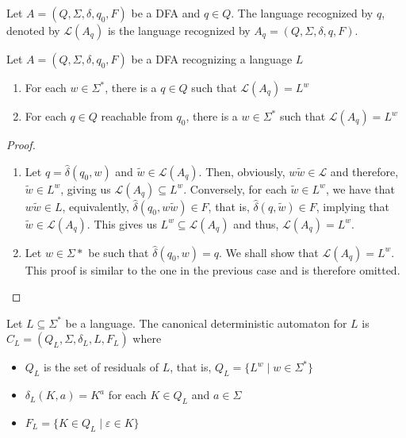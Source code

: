 \begin{definition}
    Let $A = (Q,\Sigma,\delta,q_0,F)$ be a DFA and $q\in Q$. The language recognized by $q$, denoted by $\mathcal{L}(A_q)$ is the language recognized by $A_q=(Q,\Sigma,\delta,q,F)$.
\end{definition}

\begin{proposition}
    Let $A = (Q,\Sigma,\delta,q_0,F)$ be a DFA recognizing a language $L$ 
    \begin{enumerate}
        \item For each $w\in\Sigma^*$, there is a $q\in Q$ such that $\mathcal{L}(A_q) = L^w$ 
        \item For each $q\in Q$ reachable from $q_0$, there is a $w\in\Sigma^*$ such that $\mathcal{L}(A_q)=L^w$
    \end{enumerate}
\end{proposition}
\begin{proof}
    \hfill 
    \begin{enumerate}
        \item Let $q = \hat{\delta}(q_0, w)$ and $\widetilde{w}\in\mathcal{L}(A_q)$. Then, obviously, $w\widetilde{w}\in\mathcal{L}$ and therefore, $\widetilde{w}\in L^w$, giving us $\mathcal{L}(A_q)\subseteq L^w$. Conversely, for each $\widetilde{w}\in L^w$, we have that $w\widetilde{w}\in L$, equivalently, $\hat{\delta}(q_0,w\widetilde{w})\in F$, that is, $\hat{\delta}(q, \widetilde{w})\in F$, implying that $\widetilde{w}\in\mathcal{L}(A_q)$. This gives us $L^w\subseteq\mathcal{L}(A_q)$ and thus, $\mathcal{L}(A_q) = L^w$.
        \item Let $w\in\Sigma*$ be such that $\hat{\delta}(q_0, w) = q$. We shall show that $\mathcal{L}(A_q) = L^w$. This proof is similar to the one in the previous case and is therefore omitted.
    \end{enumerate}
\end{proof}

\begin{definition}
    Let $L\subseteq\Sigma^*$ be a language. The canonical deterministic automaton for $L$ is $C_L = (Q_L,\Sigma,\delta_L,L,F_L)$ where 
    \begin{itemize}
        \item $Q_L$ is the set of residuals of $L$, that is, $Q_L = \{L^w\mid w\in\Sigma^*\}$
        \item $\delta_L(K,a) = K^a$ for each $K\in Q_L$ and $a\in\Sigma$ 
        \item $F_L=\{K\in Q_L\mid\varepsilon\in K\}$
    \end{itemize}
\end{definition}

